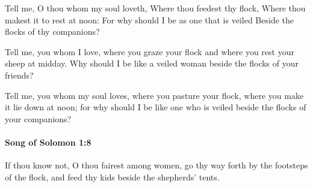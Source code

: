 			\begin{versebox}
					\item[BHS] 
					\item[LXX] 
					\item[ASV] Tell me, O thou whom my soul loveth, Where thou feedest thy flock, Where thou makest it to rest at noon: For why should I be as one that is veiled Beside the flocks of thy companions?
					\item[NIV] Tell me, you whom I love, where you graze your flock and where you rest your sheep at midday. Why should I be like a veiled woman beside the flocks of your friends?
					\item[NRSV] Tell me, you whom my soul loves, where you pasture your flock, where you make it lie down at noon; for why should I be like one who is veiled beside the flocks of your companions?
			\end{versebox}

		\paragraph{Song of Solomon 1:8} %
			\label{SONGOFSOLOMON-1-8}

			If thou know not, O thou fairest among women, go thy way forth by the footsteps of the flock, and feed thy kids beside the shepherds’ tents.

